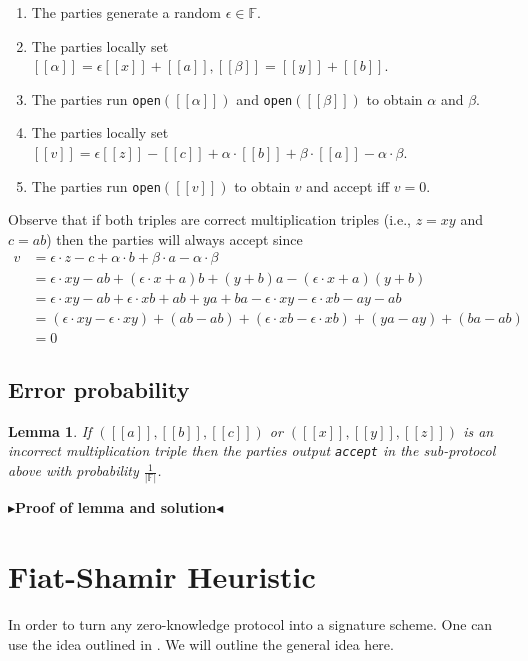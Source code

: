 \documentclass[twoside,11pt,openright]{report}
\theoremstyle{definition}
\theoremstyle{plain}
\newtheorem{lemma}{Lemma}[section]
\newcommand{\todo}[1]{{\color[rgb]{.5,0,0}\textbf{$\blacktriangleright$#1$\blacktriangleleft$}}}
\begin{document}
\begin{enumerate}
  \item The parties generate a random $\epsilon \in \mathbb{F}$.
  \item The parties locally set $[[\alpha]] = \epsilon[[x]] + [[a]], [[\beta]] = [[y]] + [[b]]$.
  \item The parties run \texttt{open}$([[\alpha]])$ and \texttt{open}$([[\beta]])$ to obtain $\alpha$ and $\beta$.
  \item The parties locally set $[[v]] = \epsilon[[z]] - [[c]] + \alpha  \cdot [[b]] + \beta  \cdot [[a]] - \alpha  \cdot \beta$.
  \item The parties run \texttt{open}$([[v]])$ to obtain $v$ and accept iff $v = 0$.

\end{enumerate}
Observe that if both triples are correct multiplication triples (i.e., $z = xy$ and $c = ab$) then the parties will always accept since
\begin{align}
  v & = \epsilon \cdot z - c + \alpha \cdot b + \beta \cdot a - \alpha \cdot \beta                                            \\
    & = \epsilon \cdot xy - ab + (\epsilon \cdot x + a)b + (y + b)a - (\epsilon \cdot x + a)(y + b)                           \\
    & = \epsilon \cdot xy - ab + \epsilon \cdot xb + ab + ya + ba - \epsilon \cdot xy - \epsilon \cdot xb - ay - ab           \\
    & = (\epsilon \cdot xy - \epsilon \cdot xy) + (ab - ab) + (\epsilon \cdot xb - \epsilon \cdot xb) + (ya - ay) + (ba - ab) \\
    & = 0
\end{align}

\subsection{Error probability}

\begin{lemma}
  If $([[a]], [[b]], [[c]])$ or $([[x]], [[y]], [[z]])$ is an incorrect multiplication triple then the parties output \texttt{accept} in the sub-protocol above with probability $\frac{1}{|\mathbb{F}|}$.
\end{lemma}

\todo{Proof of lemma and solution}

\section{Fiat-Shamir Heuristic}
\label{sec:fiatshamir}
In order to turn any zero-knowledge protocol into a signature scheme. One can use the idea outlined in \cite{fiat1986prove}. We will outline the general idea here.
\end{document}
